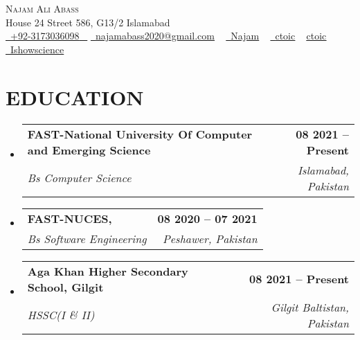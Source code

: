 \documentclass[letterpaper,11pt]{article}
\makeatletter
\newcommand{\resumeSubheading}[4]{
  \vspace{-2pt}\item
    \begin{tabular*}{1.0\textwidth}[t]{l@{\extracolsep{\fill}}r}
      \textbf{\large#1} & \textbf{\small #2} \\
      \textit{\large#3} & \textit{\small #4} \\
     
    \end{tabular*}\vspace{-7pt}
}
\newcommand{\resumeSubHeadingListStart}{\begin{itemize}[leftmargin=0.0in, label={}]}
\newcommand{\resumeSubHeadingListEnd}{\end{itemize}}
\makeatother
\begin{document}

\begin{center}
    {\Huge \scshape Najam Ali Abass} \\ \vspace{1pt}
    House 24 Street 586, G13/2 Islamabad \\ \vspace{1pt}
    \small \href{tel:+92-3173036098}{ \raisebox{-0.1\height}\faPhone\ \underline{+92-3173036098} ~} \href{mailto:najamabass2020@gmail.com}{\raisebox{-0.2\height}\faEnvelope\  \underline{najamabass2020@gmail.com}} ~
    \href{https://www.linkedin.com/in/ctoic/}{\raisebox{-0.1\height}\faLinkedinSquare\ \underline{Najam}}  ~
    \href{https://github.com/Ctoic}{\raisebox{-0.2\height}\faGithub\ \underline{ctoic}} ~
    \href{https://www.instagram.com/dev_with_ctoic}{\raisebox{-0.2\height}\faInstagram \underline{ctoic}} ~
    \href{https://codeforces.com/profile/yourid}{\raisebox{-0.2\height}\faYoutube\ \underline{Ishowscience}}
    
    
    \vspace{-8pt}
\end{center}




\section{EDUCATION}
 \resumeSubHeadingListStart
    \resumeSubheading
      {FAST-National University Of Computer and Emerging Science}{08 2021 -- Present}
      {Bs Computer Science    }{Islamabad, Pakistan}
  \resumeSubHeadingListEnd
  \resumeSubHeadingListStart
    \resumeSubheading
      {FAST-NUCES,}{08 2020 -- 07 2021}
      {Bs Software Engineering }{Peshawer, Pakistan}
  \resumeSubHeadingListEnd
 
  \resumeSubHeadingListStart
    \resumeSubheading
      {Aga Khan Higher Secondary School, Gilgit}{08 2021 -- Present}
      {HSSC(I \& II)  }{Gilgit Baltistan, Pakistan}
  \resumeSubHeadingListEnd


\end{document}
